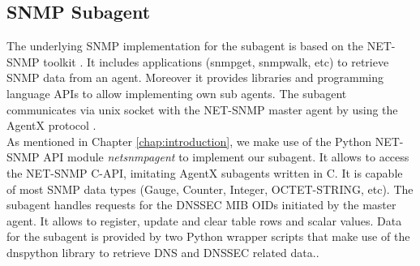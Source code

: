 \subsection{SNMP Subagent}
\label{section:sub-agent}
The underlying SNMP implementation for the subagent is based on the NET-SNMP toolkit \cite{net-snmp}. It includes applications (snmpget, snmpwalk, etc) to retrieve SNMP data from an agent. Moreover it provides libraries and programming language APIs to allow implementing own sub agents. The subagent communicates via unix socket with the NET-SNMP master agent by using  the AgentX protocol \cite{agentx-netsnmp}.
\\
As mentioned in Chapter \ref{chap:introduction}, we make use of the Python NET-SNMP API module \textit{netsnmpagent} \cite{pythonnetsnmpagent} to implement our subagent. It allows to access the NET-SNMP C-API, imitating AgentX subagents written in C. It is capable of most SNMP data types (Gauge, Counter, Integer, OCTET-STRING, etc). The subagent handles requests for the DNSSEC MIB OIDs initiated by the master agent. It allows to register, update and clear table rows and scalar values. Data for the subagent is provided by two Python wrapper scripts that make use of the dnspython \cite{dnspython} library to retrieve DNS and DNSSEC related data.. 



